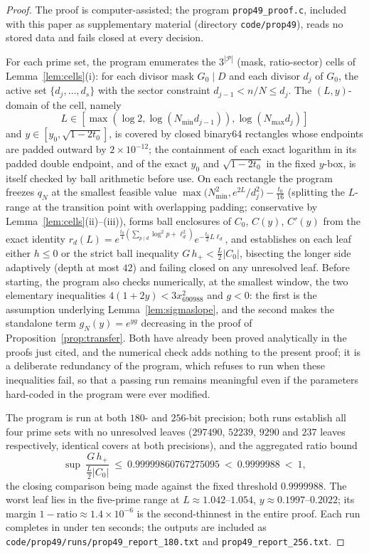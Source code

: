 \documentclass[11pt]{article}
\theoremstyle{definition}
\newcommand{\calP}{\mathcal{P}}
\begin{document}
\begin{proof}
The proof is computer-assisted; the program
\texttt{prop49\_proof.c}, included with this paper as
supplementary material (directory \texttt{code/prop49}), reads no
stored data and fails closed at every decision.

For each prime set, the program enumerates the $3^{|\calP|}$
(mask, ratio-sector) cells of Lemma~\ref{lem:cells}(i): for each
divisor mask $G_0\mid D$ and each divisor $d_j$ of $G_0$, the
active set $\{d_j,\dots,d_s\}$ with the sector constraint
$d_{j-1}<n/N\le d_j$. The $(L,y)$-domain of the cell, namely
$$L\in[\max(\log2,\log(N_{\min}d_{j-1})),\log(N_{\max}d_j)]$$ and
$y\in[y_0,\sqrt{1-2t_0}]$, is covered by closed binary64
rectangles whose endpoints are padded outward by $2\times10^{-12}$;
the containment of each exact logarithm in its padded double
endpoint, and of the exact $y_0$ and $\sqrt{1-2t_0}$ in the fixed
$y$-box, is itself checked by ball arithmetic before use. On
each rectangle the program freezes $q_N$ at the smallest feasible
value $\max\bigl(N_{\min}^2,e^{2L}/d_j^2\bigr)-\frac{t_0}{16}$
(splitting the $L$-range at the transition point with overlapping
padding; conservative by Lemma~\ref{lem:cells}(ii)--(iii)), forms
ball enclosures of $C_0$, $C(y)$, $C'(y)$ from the exact identity
$r_d(L)=e^{\frac{t_0}4(\sum_{p\mid d}\log^2p+\ell_d^2)}
e^{-\frac{t_0}2L\ell_d}$, and establishes on each leaf either
$h\le0$ or the strict ball inequality $G\,h_+<\frac L2|C_0|$,
bisecting the longer side adaptively (depth at most $42$) and
failing closed on any unresolved leaf. Before starting, the
program also checks numerically, at the
smallest window, the two elementary inequalities
$4(1+2y)<3x_{690988}^2$ and $g<0$: the first is the assumption
underlying Lemma~\ref{lem:sigmaslope}, and the second makes the
standalone term $g_N(y)=e^{yg}$ decreasing in the proof of
Proposition~\ref{prop:transfer}. Both have already been proved
analytically in the proofs just cited, and the numerical check adds
nothing to the present proof; it is a deliberate redundancy of the
program, which refuses to run when these inequalities
fail, so that a passing run remains meaningful even if the
parameters hard-coded in the program were ever modified.

The program is run at both $180$- and $256$-bit precision; both
runs establish
all four prime sets with no unresolved leaves ($297490$, $52239$,
$9290$ and $237$ leaves respectively, identical covers at both
precisions), and the aggregated ratio bound
\[
\sup\ \frac{G\,h_+}{\frac L2|C_0|}\ \le\ 0.99999860767275095
\ <\ 0.9999988\ <\ 1 ,
\]
the closing comparison being made against the fixed threshold
$0.9999988$. The worst leaf lies in the five-prime range at
$L\approx1.042$--$1.054$, $y\approx0.1997$--$0.2022$; its margin
$1-\text{ratio}\approx1.4\times10^{-6}$ is the second-thinnest in
the entire proof. Each run completes in under ten seconds; the
outputs are included as
\texttt{code/prop49/runs/prop49\_report\_180.txt}
and \texttt{prop49\_report\_256.txt}.
\end{proof}
\end{document}
